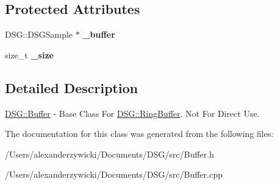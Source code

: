 \subsection*{Protected Attributes}
\begin{DoxyCompactItemize}
\item 
\hypertarget{class_d_s_g_1_1_buffer_ae4a4db8fe44b62db18d6a7855b5773f9}{D\+S\+G\+::\+D\+S\+G\+Sample $\ast$ {\bfseries \+\_\+buffer}}\label{class_d_s_g_1_1_buffer_ae4a4db8fe44b62db18d6a7855b5773f9}

\item 
\hypertarget{class_d_s_g_1_1_buffer_a4e2fef9ed617af2554b25c999def8f71}{size\+\_\+t {\bfseries \+\_\+size}}\label{class_d_s_g_1_1_buffer_a4e2fef9ed617af2554b25c999def8f71}

\end{DoxyCompactItemize}


\subsection{Detailed Description}
\hyperlink{class_d_s_g_1_1_buffer}{D\+S\+G\+::\+Buffer} -\/ Base Class For \hyperlink{class_d_s_g_1_1_ring_buffer}{D\+S\+G\+::\+Ring\+Buffer}. Not For Direct Use. 

The documentation for this class was generated from the following files\+:\begin{DoxyCompactItemize}
\item 
/\+Users/alexanderzywicki/\+Documents/\+D\+S\+G/src/Buffer.\+h\item 
/\+Users/alexanderzywicki/\+Documents/\+D\+S\+G/src/Buffer.\+cpp\end{DoxyCompactItemize}
